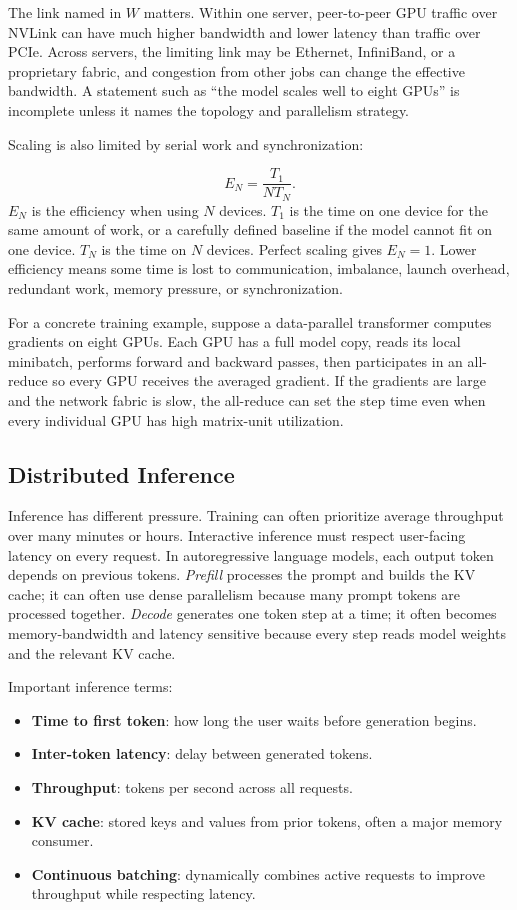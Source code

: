 The link named in \(W\) matters. Within one server, peer-to-peer GPU traffic over NVLink can have much higher bandwidth and lower latency than traffic over PCIe. Across servers, the limiting link may be Ethernet, InfiniBand, or a proprietary fabric, and congestion from other jobs can change the effective bandwidth. A statement such as ``the model scales well to eight GPUs'' is incomplete unless it names the topology and parallelism strategy.

Scaling is also limited by serial work and synchronization:
\begin{keyequation}
\[
  E_N =
  \frac{T_1}{N T_N}.
\]
\tcblower
\(E_N\) is the efficiency when using \(N\) devices. \(T_1\) is the time on one device for the same amount of work, or a carefully defined baseline if the model cannot fit on one device. \(T_N\) is the time on \(N\) devices. Perfect scaling gives \(E_N = 1\). Lower efficiency means some time is lost to communication, imbalance, launch overhead, redundant work, memory pressure, or synchronization.
\end{keyequation}

For a concrete training example, suppose a data-parallel transformer computes gradients on eight GPUs. Each GPU has a full model copy, reads its local minibatch, performs forward and backward passes, then participates in an all-reduce so every GPU receives the averaged gradient. If the gradients are large and the network fabric is slow, the all-reduce can set the step time even when every individual GPU has high matrix-unit utilization.

\subsection{Distributed Inference}

Inference has different pressure. Training can often prioritize average throughput over many minutes or hours. Interactive inference must respect user-facing latency on every request. In autoregressive language models, each output token depends on previous tokens. \emph{Prefill} processes the prompt and builds the KV cache; it can often use dense parallelism because many prompt tokens are processed together. \emph{Decode} generates one token step at a time; it often becomes memory-bandwidth and latency sensitive because every step reads model weights and the relevant KV cache.

Important inference terms:

\begin{itemize}[leftmargin=*]
  \item \textbf{Time to first token}: how long the user waits before generation begins.
  \item \textbf{Inter-token latency}: delay between generated tokens.
  \item \textbf{Throughput}: tokens per second across all requests.
  \item \textbf{KV cache}: stored keys and values from prior tokens, often a major memory consumer.
  \item \textbf{Continuous batching}: dynamically combines active requests to improve throughput while respecting latency.
\end{itemize}

